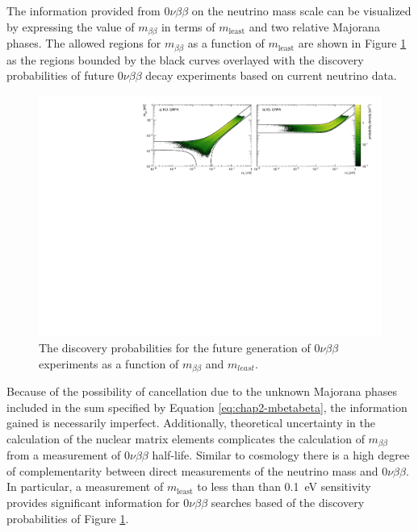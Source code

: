 The information provided from $0\nu\beta\beta$ on the neutrino mass scale can be visualized by expressing the value of $m_{\beta\beta}$ in terms of $m_\textrm{least}$ and two relative Majorana phases. The allowed regions for $m_{\beta\beta}$ as a function of $m_\textrm{least}$ are shown in Figure \ref{fig:chap2-nu-mass-0nbb-posterior} as the regions bounded by the black curves overlayed with the discovery probabilities of future $0\nu\beta\beta$ decay experiments based on current neutrino data.
\begin{figure}[htbp]
    \centering
    \includegraphics[width=1.0\textwidth]{figs/Chapter-2/230228_nu_mass_0nbb.pdf}
    \caption{The discovery probabilities for the future generation of $0\nu\beta\beta$ experiments as a function of $m_{\beta\beta}$ and $m_{least}$. }
    \label{fig:chap2-nu-mass-0nbb-posterior}
\end{figure}
Because of the possibility of cancellation due to the unknown Majorana phases included in the sum specified by Equation \ref{eq:chap2-mbetabeta}, the information gained is necessarily imperfect. Additionally, theoretical uncertainty in the calculation of the nuclear matrix elements complicates the calculation of $m_{\beta\beta}$ from a measurement of $0\nu\beta\beta$ half-life. Similar to cosmology there is a high degree of complementarity between direct measurements of the neutrino mass and $0\nu\beta\beta$. In particular, a measurement of $m_\textrm{least}$ to less than than 0.1~eV sensitivity provides significant information for $0\nu\beta\beta$ searches based of the discovery probabilities of Figure \ref{fig:chap2-nu-mass-0nbb-posterior}.


